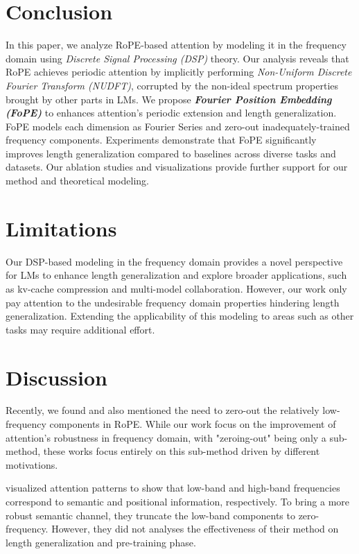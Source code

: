 \section{Conclusion}

In this paper, we analyze RoPE-based attention by modeling it in the frequency domain using \textit{Discrete Signal Processing (DSP)} theory. 
Our analysis reveals that RoPE achieves periodic attention by implicitly performing \textit{Non-Uniform Discrete Fourier Transform (NUDFT)}, corrupted by the non-ideal spectrum properties brought by other parts in LMs.
We propose \textbf{\textit{Fourier Position Embedding (FoPE)}} to enhances attention's periodic extension and length generalization. FoPE models each dimension as Fourier Series and zero-out inadequately-trained frequency components. Experiments demonstrate that FoPE significantly improves length generalization compared to baselines across diverse tasks and datasets. Our ablation studies and visualizations provide further support for our method and theoretical modeling.

\section{Limitations}
Our DSP-based modeling in the frequency domain provides a novel perspective for LMs to enhance length generalization and explore broader applications, such as kv-cache compression and multi-model collaboration.
However, our work only pay attention to the undesirable frequency domain properties hindering length generalization. Extending the applicability of this modeling to areas such as other tasks may require additional effort. 

\section{Discussion}
Recently, we found \citet{barbero2024round} and \citet{chen2024hope} also mentioned the need to zero-out the relatively low-frequency components in RoPE. While our work focus on the improvement of attention's robustness in frequency domain, with "zeroing-out" being only a sub-method, these works focus entirely on this sub-method driven by different motivations.

\citet{barbero2024round} visualized attention patterns to show that low-band and high-band frequencies correspond to semantic and positional information, respectively. To bring a more robust semantic channel, they truncate the low-band components to zero-frequency. 
However, they did not analyses the effectiveness of their method on length generalization and pre-training phase. 


